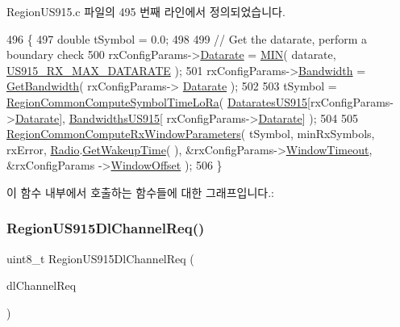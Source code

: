 Region\+U\+S915.\+c 파일의 495 번째 라인에서 정의되었습니다.


\begin{DoxyCode}
496 \{
497     \textcolor{keywordtype}{double} tSymbol = 0.0;
498 
499     \textcolor{comment}{// Get the datarate, perform a boundary check}
500     rxConfigParams->\mbox{\hyperlink{structs_rx_config_params_ae2f6080f3aa0e9485c55513ca56bb24d}{Datarate}} = \mbox{\hyperlink{utilities_8h_a3acffbd305ee72dcd4593c0d8af64a4f}{MIN}}( datarate, \mbox{\hyperlink{group___r_e_g_i_o_n_u_s915_ga01e1ec534d6632367f457fac9488a1a2}{US915\_RX\_MAX\_DATARATE}} );
501     rxConfigParams->\mbox{\hyperlink{structs_rx_config_params_aa8fc32e4883d30642e0ceb5845006a57}{Bandwidth}} = \mbox{\hyperlink{_region_u_s915_8c_afbe81e6d36760141722791d216d4ac60}{GetBandwidth}}( rxConfigParams->
      \mbox{\hyperlink{structs_rx_config_params_ae2f6080f3aa0e9485c55513ca56bb24d}{Datarate}} );
502 
503     tSymbol = \mbox{\hyperlink{group___r_e_g_i_o_n_c_o_m_m_o_n_ga79ed8b6555b68276d3c9ff2626b20fc8}{RegionCommonComputeSymbolTimeLoRa}}( 
      \mbox{\hyperlink{group___r_e_g_i_o_n_u_s915_ga715249ddef431b316389e6ddc55d903b}{DataratesUS915}}[rxConfigParams->\mbox{\hyperlink{structs_rx_config_params_ae2f6080f3aa0e9485c55513ca56bb24d}{Datarate}}], \mbox{\hyperlink{group___r_e_g_i_o_n_u_s915_ga43866c304643f3a94e426a1a218ded00}{BandwidthsUS915}}[
      rxConfigParams->\mbox{\hyperlink{structs_rx_config_params_ae2f6080f3aa0e9485c55513ca56bb24d}{Datarate}}] );
504 
505     \mbox{\hyperlink{group___r_e_g_i_o_n_c_o_m_m_o_n_gaba7114d0ca01f04933710feb13646138}{RegionCommonComputeRxWindowParameters}}( tSymbol, minRxSymbols, 
      rxError, \mbox{\hyperlink{sx1276mb1las_8c_acf9fe61a72c16fa29a0dc449d23e3820}{Radio}}.\mbox{\hyperlink{struct_radio__s_aa6c05429af1a9f479d4720d95d0ee774}{GetWakeupTime}}( ), &rxConfigParams->\mbox{\hyperlink{structs_rx_config_params_a9d9f6c16ea62e2bcc09b100e2cb83e3f}{WindowTimeout}}, &rxConfigParams
      ->\mbox{\hyperlink{structs_rx_config_params_a9d092276960345e3b06ba105cf0c8b98}{WindowOffset}} );
506 \}
\end{DoxyCode}
이 함수 내부에서 호출하는 함수들에 대한 그래프입니다.\+:
\mbox{\label{group___r_e_g_i_o_n_u_s915_gaa4cc824d120b1ef55d88fae38282f8bc}} 
\subsubsection{\texorpdfstring{Region\+U\+S915\+Dl\+Channel\+Req()}{RegionUS915DlChannelReq()}}
{\footnotesize\ttfamily uint8\+\_\+t Region\+U\+S915\+Dl\+Channel\+Req (\begin{DoxyParamCaption}\item[{\mbox{\hyperlink{group___r_e_g_i_o_n_gae0d608ff1f8ea0a430e4f9a4c38ec7f3}{Dl\+Channel\+Req\+Params\+\_\+t}} $\ast$}]{dl\+Channel\+Req }\end{DoxyParamCaption})}



